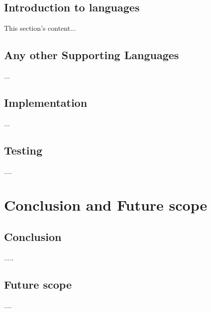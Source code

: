 \documentclass[12pt]{myclass}
\begin{document}
\subsection{Introduction to languages}
This section's content...
\subsection{Any other Supporting Languages}
...
\subsection{Implementation}
...
\subsection{Testing}
....

\section{Conclusion and Future scope}
\subsection{Conclusion}
.....
\subsection{Future scope}
....



\end{document}
